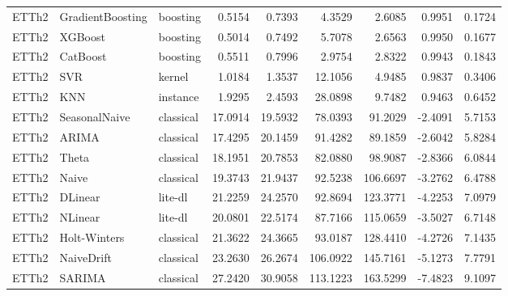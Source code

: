 \begin{tabular}{lllrrrrrr}
ETTh2 & GradientBoosting & boosting & 0.5154 & 0.7393 & 4.3529 & 2.6085 & 0.9951 & 0.1724 \\
ETTh2 & XGBoost & boosting & 0.5014 & 0.7492 & 5.7078 & 2.6563 & 0.9950 & 0.1677 \\
ETTh2 & CatBoost & boosting & 0.5511 & 0.7996 & 2.9754 & 2.8322 & 0.9943 & 0.1843 \\
ETTh2 & SVR & kernel & 1.0184 & 1.3537 & 12.1056 & 4.9485 & 0.9837 & 0.3406 \\
ETTh2 & KNN & instance & 1.9295 & 2.4593 & 28.0898 & 9.7482 & 0.9463 & 0.6452 \\
ETTh2 & SeasonalNaive & classical & 17.0914 & 19.5932 & 78.0393 & 91.2029 & -2.4091 & 5.7153 \\
ETTh2 & ARIMA & classical & 17.4295 & 20.1459 & 91.4282 & 89.1859 & -2.6042 & 5.8284 \\
ETTh2 & Theta & classical & 18.1951 & 20.7853 & 82.0880 & 98.9087 & -2.8366 & 6.0844 \\
ETTh2 & Naive & classical & 19.3743 & 21.9437 & 92.5238 & 106.6697 & -3.2762 & 6.4788 \\
ETTh2 & DLinear & lite-dl & 21.2259 & 24.2570 & 92.8694 & 123.3771 & -4.2253 & 7.0979 \\
ETTh2 & NLinear & lite-dl & 20.0801 & 22.5174 & 87.7166 & 115.0659 & -3.5027 & 6.7148 \\
ETTh2 & Holt-Winters & classical & 21.3622 & 24.3665 & 93.0187 & 128.4410 & -4.2726 & 7.1435 \\
ETTh2 & NaiveDrift & classical & 23.2630 & 26.2674 & 106.0922 & 145.7161 & -5.1273 & 7.7791 \\
ETTh2 & SARIMA & classical & 27.2420 & 30.9058 & 113.1223 & 163.5299 & -7.4823 & 9.1097 \\
\bottomrule
\end{tabular}
